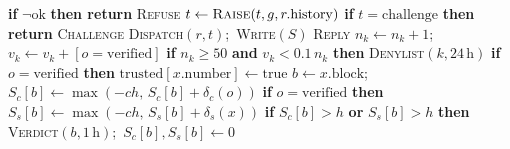 \begin{algorithmic}[1]
\STATE \textbf{if} $\neg\mathrm{ok}$ \textbf{then return} \textsc{Refuse}
\STATE $t \gets \textsc{Raise}(t, g, r.\mathrm{history})$
\STATE \textbf{if} $t = \mathrm{challenge}$ \textbf{then return} \textsc{Challenge}
\STATE \textsc{Dispatch}$(r, t)$;\ \textsc{Write}$(S)$
\RETURN \textsc{Reply}
\ENDPROCEDURE
{}
\STATE $n_k \gets n_k + 1$;\ $v_k \gets v_k + [o = \mathrm{verified}]$
\STATE \textbf{if} $n_k \ge 50$ \textbf{and} $v_k < 0.1\, n_k$ \textbf{then} \textsc{Denylist}$(k, 24\,\mathrm{h})$
\ENDFOR
\STATE \textbf{if} $o = \mathrm{verified}$ \textbf{then} $\mathrm{trusted}[x.\mathrm{number}] \gets \mathrm{true}$
\STATE $b \gets x.\mathrm{block}$;\ $S_c[b] \gets \max(-ch,\, S_c[b] + \delta_c(o))$
\STATE \textbf{if} $o = \mathrm{verified}$ \textbf{then} $S_s[b] \gets \max(-ch,\, S_s[b] + \delta_s(x))$
\STATE \textbf{if} $S_c[b] > h$ \textbf{or} $S_s[b] > h$ \textbf{then} \textsc{Verdict}$(b, 1\,\mathrm{h})$;\ $S_c[b], S_s[b] \gets 0$
\ENDPROCEDURE
\end{algorithmic}
